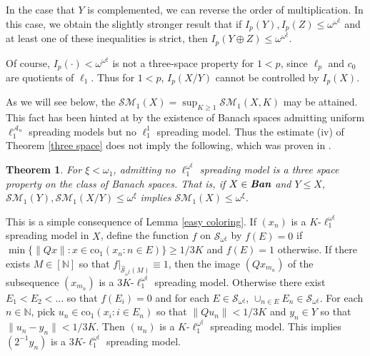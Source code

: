 \documentclass[12pt]{amsart}
\newtheorem{theorem}{Theorem}[section]
\theoremstyle{definition}
\newcommand{\infin}{[\mathbb{N}]}
\newcommand{\nn}{\mathbb{N}}
\newcommand{\aaa}{\mathcal{A}}
\newcommand{\sss}{\mathcal{S}}
\newcommand{\ssm}{\mathcal{SM}}
\begin{document}
In the case that $Y$ is complemented, we can reverse the order of multiplication.  In this case, we obtain the slightly stronger result that if $I_p(Y), I_p(Z)\leqslant \omega^{\omega^\xi}$ and at least one of these inequalities is strict, then $I_p(Y\oplus Z)\leqslant \omega^{\omega^\xi}$.  

Of course, $I_p(\cdot)<\omega^{\omega^\xi}$ is not a three-space property for $1<p$, since $\ell_p$ and $c_0$ are quotients of $\ell_1$.  Thus for $1<p$, $I_p(X/Y)$ cannot be controlled by $I_p(X)$.  

As we will see below, the $\ssm_1(X)= \sup_{K\geqslant 1} \ssm_1(X, K)$ may be attained. This fact has been hinted at by the existence of Banach spaces admitting uniform $\ell_1^{\aaa_n}$ spreading models but no $\ell_1^1$ spreading model.  Thus the estimate (iv) of Theorem \ref{three space} does not imply the following, which was proven in \cite{BCM}.  

\begin{theorem} For $\xi<\omega_1$, admitting no $\ell_1^{\omega^\xi}$ spreading model is a three space property on the class of Banach spaces.  That is, if $X\in \emph{\textbf{Ban}}$ and $Y\leqslant X$, $\ssm_1(Y), \ssm_1(X/Y)\leqslant \omega^\xi$ implies $\ssm_1(X)\leqslant \omega^\xi$.  

\label{BCM theorem 2}

\end{theorem}


This is a simple consequence of Lemma \ref{easy coloring}.  If $(x_n)$ is a $K$-$\ell_1^{\omega^\xi}$ spreading model in $X$, define the function $f$ on $\widehat{\sss}_{\omega^\xi}$ by $f(E)=0$ if $\min \{\|Qx\|:x\in \text{co}_1(x_n:n\in E)\}\geqslant 1/3K$ and $f(E)=1$ otherwise.  If there exists $M\in \infin$ so that $f|_{\widehat{\sss}_{\omega^\xi}(M)}\equiv 1$, then the image $(Qx_{m_n})$ of the subsequence $(x_{m_n})$ is a $3K$-$\ell_1^{\omega^\xi}$ spreading model.  Otherwise there exist $E_1<E_2<\ldots$ so that $f(E_i)=0$ and for each $E\in \sss_{\omega^\xi}$, $\cup_{n\in E}E_n\in \sss_{\omega^\xi}$.  For each $n\in \nn$, pick $u_n\in \text{co}_1(x_i:i\in E_n)$ so that $\|Qu_n\|< 1/3K$ and $y_n\in Y$ so that $\|u_n-y_n\|< 1/3K$.  Then $(u_n)$ is a $K$-$\ell_1^{\omega^\xi}$ spreading model.  This implies $(2^{-1}y_n)$ is a $3K$-$\ell_1^{\omega^\xi}$ spreading model.  
\end{document}
